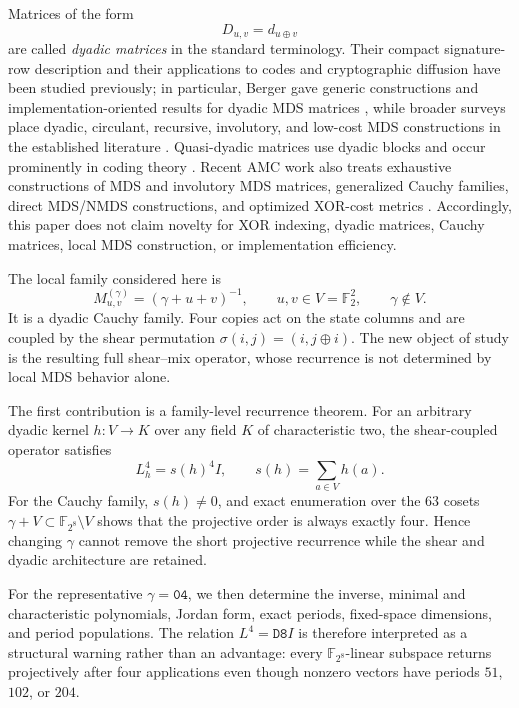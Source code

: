\documentclass[10pt,reqno]{amsart}
\theoremstyle{plain}
\theoremstyle{remark}\newtheorem{remark}[theorem]{Remark}
\theoremstyle{definition}\newtheorem{definition}[theorem]{Definition}
\newcommand{\F}{\mathbb F}
\begin{document}
Matrices of the form
\[
D_{u,v}=d_{u\oplus v}
\]
are called \emph{dyadic matrices} in the standard terminology.  Their compact signature-row description and their applications to codes and cryptographic diffusion have been studied previously; in particular, Berger gave generic constructions and implementation-oriented results for dyadic MDS matrices \cite{Berger2014}, while broader surveys place dyadic, circulant, recursive, involutory, and low-cost MDS constructions in the established literature \cite{GuptaPandeyRay2019,JunodVaudenay2004}.  Quasi-dyadic matrices use dyadic blocks and occur prominently in coding theory \cite{MartinezPllahaKelley2025}.  Recent AMC work also treats exhaustive constructions of MDS and involutory MDS matrices, generalized Cauchy families, direct MDS/NMDS constructions, and optimized XOR-cost metrics \cite{Kumar2025,MousaviEsmaeiliGulliver2025,GuptaPandeySamanta2026,Wang2022,Wang2023}.  Accordingly, this paper does not claim novelty for XOR indexing, dyadic matrices, Cauchy matrices, local MDS construction, or implementation efficiency.

The local family considered here is
\[
M^{(\gamma)}_{u,v}=(\gamma+u+v)^{-1},\qquad u,v\in V=\F_2^2,
\qquad \gamma\notin V.
\]
It is a dyadic Cauchy family.  Four copies act on the state columns and are coupled by the shear permutation \(\sigma(i,j)=(i,j\oplus i)\).  The new object of study is the resulting full shear--mix operator, whose recurrence is not determined by local MDS behavior alone.

The first contribution is a family-level recurrence theorem.  For an arbitrary dyadic kernel \(h:V\to K\) over any field \(K\) of characteristic two, the shear-coupled operator satisfies
\[
L_h^4=s(h)^4I,\qquad s(h)=\sum_{a\in V}h(a).
\]
For the Cauchy family, \(s(h)\ne0\), and exact enumeration over the \(63\) cosets \(\gamma+V\subset\F_{2^8}\setminus V\) shows that the projective order is always exactly four.  Hence changing \(\gamma\) cannot remove the short projective recurrence while the shear and dyadic architecture are retained.

For the representative \(\gamma=\mathtt{04}\), we then determine the inverse, minimal and characteristic polynomials, Jordan form, exact periods, fixed-space dimensions, and period populations.  The relation \(L^4=\mathtt{D8}I\) is therefore interpreted as a structural warning rather than an advantage: every \(\F_{2^8}\)-linear subspace returns projectively after four applications even though nonzero vectors have periods \(51\), \(102\), or \(204\).
\end{document}
